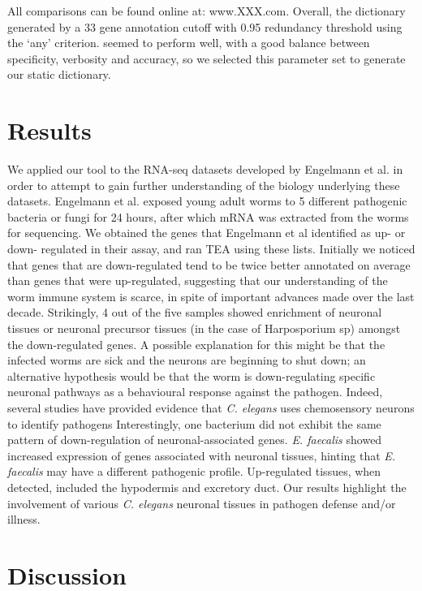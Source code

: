 \documentclass[linenumbers, doublespacing]{bmcart}
\begin{document}
	
	 All comparisons can be found online at: www.XXX.com. Overall, the dictionary generated by a 33 gene annotation cutoff with 0.95 redundancy threshold using the `any' criterion. seemed to perform well, with a good balance between specificity, verbosity and accuracy, so we selected this parameter set to generate our static dictionary. 
	
	
\section*{Results}
	We applied our tool to the RNA-seq datasets developed by Engelmann et al. \cite{Engelmann2010} in order to attempt to gain further understanding of the biology underlying these datasets. Engelmann et al.  exposed young adult worms to 5 different pathogenic bacteria or fungi for 24 hours, after which mRNA was extracted from the worms for sequencing. We obtained the genes that Engelmann et al identified as up- or down- regulated in their assay, and ran TEA using these lists. Initially we noticed that genes that are down-regulated tend to be twice better annotated on average than genes that were up-regulated, suggesting that our understanding of the worm immune system is scarce, in spite of important advances made over the last decade. Strikingly, 4 out of the five samples showed enrichment of neuronal tissues or neuronal precursor tissues (in the case of Harposporium sp) amongst the down-regulated genes. A possible explanation for this might be that the infected worms are sick and the neurons are beginning to shut down; an alternative hypothesis would be that the worm is down-regulating specific neuronal pathways as a behavioural response against the pathogen. Indeed, several studies\cite{Meisel2014, Zhang2005} have provided evidence that \emph{C. elegans} uses chemosensory neurons to identify pathogens Interestingly, one bacterium did not exhibit the same pattern of down-regulation of neuronal-associated genes. \emph{E. faecalis} showed increased expression of genes associated with neuronal tissues, hinting that \emph{E. faecalis} may have a different pathogenic profile. Up-regulated tissues, when detected, included the hypodermis and excretory duct. 
	Our results highlight the involvement of various \emph{C. elegans} neuronal tissues in pathogen defense and/or illness.
	
\section*{Discussion}
\end{document}
